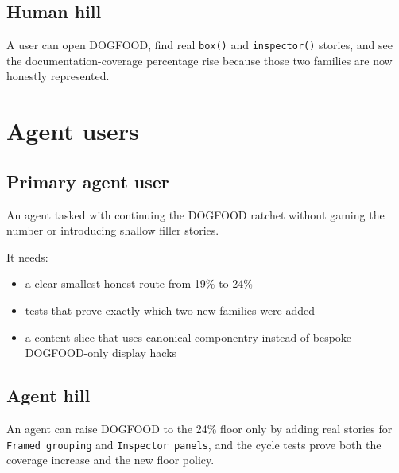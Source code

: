 \subsection{Human hill}\label{record-068-human-hill}

A user can open DOGFOOD, find real \texttt{b\allowbreak{}o\allowbreak{}x\allowbreak{}(\allowbreak{})} and \texttt{i\allowbreak{}n\allowbreak{}s\allowbreak{}p\allowbreak{}e\allowbreak{}c\allowbreak{}t\allowbreak{}o\allowbreak{}r\allowbreak{}(\allowbreak{})} stories, and see the documentation-coverage percentage rise because those two families are now honestly represented.

\section{Agent users}\label{record-068-agent-users}

\subsection{Primary agent user}\label{record-068-primary-agent-user}

An agent tasked with continuing the DOGFOOD ratchet without gaming the number or introducing shallow filler stories.

It needs:

\begin{itemize}
\tightlist
\item
  a clear smallest honest route from 19\% to 24\%
\item
  tests that prove exactly which two new families were added
\item
  a content slice that uses canonical componentry instead of bespoke DOGFOOD-only display hacks
\end{itemize}

\subsection{Agent hill}\label{record-068-agent-hill}

An agent can raise DOGFOOD to the 24\% floor only by adding real stories for \texttt{F\allowbreak{}r\allowbreak{}a\allowbreak{}m\allowbreak{}e\allowbreak{}d\allowbreak{} \allowbreak{}g\allowbreak{}r\allowbreak{}o\allowbreak{}u\allowbreak{}p\allowbreak{}i\allowbreak{}n\allowbreak{}g} and \texttt{I\allowbreak{}n\allowbreak{}s\allowbreak{}p\allowbreak{}e\allowbreak{}c\allowbreak{}t\allowbreak{}o\allowbreak{}r\allowbreak{} \allowbreak{}p\allowbreak{}a\allowbreak{}n\allowbreak{}e\allowbreak{}l\allowbreak{}s}, and the cycle tests prove both the coverage increase and the new floor policy.

